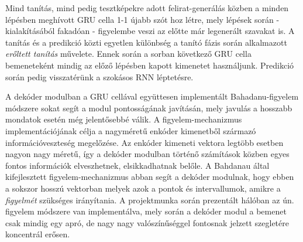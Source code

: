 \begin{multicols}{2}
\begin{Figure}
\end{Figure}
Mind tanítás, mind pedig tesztképekre adott felirat-generálás közben a minden lépésben meghívott GRU cella 1-1 újabb szót hoz létre, mely lépések során - kialakításából fakadóan - figyelembe veszi az előtte már legenerált szavakat is. A tanítás és a predikció közti egyetlen különbség a tanító fázis során alkalmazott \emph{erőltett tanítás} művelete. Ennek során a sorban következő GRU cella bemeneteként mindig az előző lépésben kapott kimenetet használjunk. Predikció során pedig visszatérünk a szokásos RNN léptetésre. \par
A dekóder modulban a GRU cellával együttesen implementált Bahadanu-figyelem módszere sokat segít a modul pontosságának javításán, mely javulás a hosszabb mondatok esetén még jelentősebbé válik. A figyelem-mechanizmus implementációjának célja a nagyméretű enkóder kimenetből származó információveszteség megelőzése. Az enkóder kimeneti vektora legtöbb esetben nagyon nagy méretű, így a dekóder modulban történő számítások közben egyes fontos információk elveszhetnek, elsikkadhatnak belőle. A Bahdanau által kifejlesztett figyelem-mechanizmus \citep{2014arXiv1409.0473B} abban segít a dekóder modulnak, hogy ebben a sokszor hosszú vektorban melyek azok a pontok és intervallumok, amikre a \emph{figyelmét} szükséges irányítania. A projektmunka során prezentált hálóban az ún.  figyelem módszere van implementálva, mely során a dekóder modul a bemenet csak mindig egy apró, de nagy nagy valószínűséggel fontosnak jelzett szegletére koncentrál erősen.


\end{multicols}
